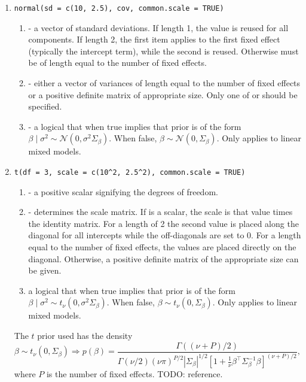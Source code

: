 \documentclass[article,shortnames]{jss}
\newcommand{\TODO}[1]{{\color{red} TODO: #1}}
\begin{document}
\begin{enumerate}
\item
\verb?normal(sd = c(10, 2.5), cov, common.scale = TRUE)?  \begin{enumerate}
  \item {} - a vector of standard deviations. If length 1,
    the value is reused for all components. If length 2, the first
    item applies to the first fixed effect (typically the intercept
    term), while the second is reused. Otherwise must be of length
    equal to the number of fixed effects.
  \item {} - either a vector of variances of length equal to
    the number of fixed effects or a positive definite matrix of
    appropriate size. Only one of  or  should be
    specified.
  \item {} - a logical that when true implies that prior
    is of the form $\beta\mid \sigma^2 \sim \mathcal{N}(0,
    \sigma^2\Sigma_\beta)$. When false, $\beta \sim \mathcal{N}(0,
    \Sigma_\beta)$. Only applies to linear mixed models.
  \end{enumerate}
\item
\verb?t(df = 3, scale = c(10^2, 2.5^2), common.scale = TRUE)?  \begin{enumerate}
  \item {} - a positive scalar signifying the degrees of freedom.
  \item {} - determines the scale matrix. If is a scalar,
    the scale is that value times the identity matrix. For a length of
    2 the second value is placed along the diagonal for all intercepts while the
    off-diagonals are set to 0. For a length equal to the number of fixed effects,
    the values are placed directly on the diagonal. Otherwise, a
    positive definite matrix of the appropriate size can be given.
  \item {} a logical that when true implies that prior
    is of the form $\beta\mid \sigma^2 \sim t_\nu(0,
    \sigma^2\Sigma_\beta)$. When false, $\beta \sim t_\nu(0,
    \Sigma_\beta)$. Only applies to linear mixed models.
  \end{enumerate}
  The $t$ prior used has the density
  \begin{equation*}
    \beta \sim t_\nu(0, \Sigma_\beta) \Rightarrow p(\beta) =
    \dfrac{\Gamma\left((\nu + P)/2\right)}
    {\Gamma(\nu/2) (\nu\pi)^{P/2}|\Sigma_\beta|^{1/2} \left[
        1 + \frac{1}{\nu}\beta^\top
        \Sigma_\beta^{-1}\beta\right]^{(\nu + P)/2}},
  \end{equation*}
  \noindent where $P$ is the number of fixed effects. \TODO{reference}.
\end{enumerate}
\end{document}
